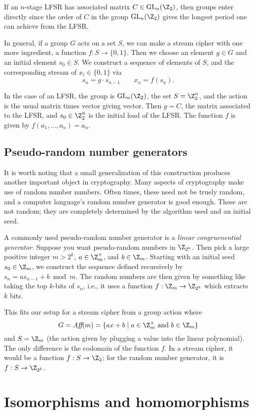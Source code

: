\documentclass[12pt]{amsart}
\DeclareMathOperator{\GL}{GL}
\theoremstyle{plain}
\theoremstyle{definition}
\theoremstyle{remark}
\begin{document}
If an $n$-stage LFSR has associated matrix $C\in\GL_n(\Z_2)$, then
groups enter directly since the order of $C$ in the group
$\GL_n(\Z_2)$ gives the longest period one can achieve from the LFSR.

In general, if a group $G$ acts on a set $S$, we can make a stream
cipher with one more ingredient, a function $f:S\to\{0,1\}$.  Then
we choose an element $g\in G$ and an initial
element $s_0\in S$.  We construct a sequence of elements of $S$, and
the corresponding stream of $x_i \in \{0,1\}$ via
\[ s_n = g\cdot s_{n-1} \qquad x_n = f(s_n).\]

In the case of an LFSR, the group is $\GL_n(\Z_2)$, the set
$S=\Z_2^n$, and the action is the usual matrix times vector giving
vector.  Then $g=C$, the matrix associated to the LFSR, and
$s_0\in\Z_2^n$ is the initial load of the LFSR.  The function $f$ is
given by $f(a_1,\ldots, a_n) = a_n$.

\subsection{Pseudo-random number generators}
It is worth noting that a small generalization of this construction
produces another important object in cryptography.  Many aspects of
cryptography make use of random number numbers.  Often times, these
need not be truely random, and a computer language's random number
generator is good enough.  These are not random; they are completely
determined by the algorithm used and an initial seed.

A commonly used pseudo-random number generator is a {\em linear
  congruenential generator}.  Suppose you want pseudo-random numbers
in $\Z_{2^k}$.  Then pick a large positive integer $m>2^k$, $a\in\Z_m^\times$, and
$b\in\Z_m$.  Starting with an initial seed $s_0\in \Z_m$, we construct
the sequence defined recursively by $s_n = as_{n-1}+b \bmod m$.  The
random numbers are then given by something like taking the top
$k$-bits of $s_n$, i.e., it uses a function $f:\Z_m\to \Z_{2^k}$ which
extracts $k$ bits.

This fits our setup for a stream cipher from a group action where 
\[G=\textit{Aff}(m) = \{ax+b\mid a\in\Z_m^\times\text{ and }
  b\in\Z_m\}\]
and $S=\Z_m$ (the action given by plugging a value into the linear
polynomial).  The only difference is the codomain of the function
$f$.  In a stream cipher, it would be a function $f:S\to \Z_2$; for
the random number generator, it is $f:S\to \Z_{2^k}$.


\section{Isomorphisms and homomorphisms}
\end{document}
